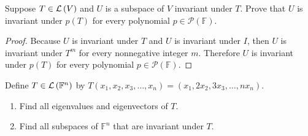 \begin{exercise}
    Suppose $T\in\mathcal{L}\left({V}\right)$ and $U$ is a subspace of $V$ invariant under $T$. Prove that $U$ is invariant under $p(T)$ for every polynomial $p\in\mathscr{P}(\mathbb{F})$.
\end{exercise}

\begin{proof}
    Because $U$ is invariant under $T$ and $U$ is invariant under $I$, then $U$ is invariant under $T^{m}$ for every nonnegative integer $m$. Therefore $U$ is invariant under $p(T)$ for every polynomial $p\in\mathscr{P}(\mathbb{F})$.
\end{proof}
\newpage

\begin{exercise}\label{chapter5:sectionA:exercise42}
    Define $T\in\mathcal{L}\left({\mathbb{F}^{n}}\right)$ by $T(x_{1}, x_{2}, x_{3}, \ldots, x_{n}) = (x_{1}, 2x_{2}, 3x_{3}, \ldots, nx_{n})$.
    \begin{enumerate}[label={(\alph*)}]
        \item Find all eigenvalues and eigenvectors of $T$.
        \item Find all subspaces of $\mathbb{F}^{n}$ that are invariant under $T$.
    \end{enumerate}
\end{exercise}

